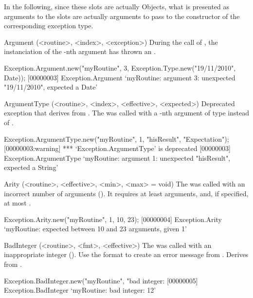In the following, since these slots are actually Objects, what is presented
as arguments to the slots are actually arguments to pass to the constructor
of the corresponding exception type.
\begin{urbiscriptapi}
\item[Argument](<routine>, <index>, <exception>)
  During the call of , the instanciation of the -nth
  argument has thrown an .
\begin{urbiscript}
Exception.Argument.new("myRoutine", 3, Exception.Type.new("19/11/2010", Date));
[00000003] Exception.Argument `myRoutine: argument 3: unexpected "19/11/2010", expected a Date'
\end{urbiscript}

\item[ArgumentType](<routine>, <index>, <effective>, <expected>)
  Deprecated exception that derives from .  The  was
  called with a -nth argument of type 
  instead of .
\begin{urbiscript}
Exception.ArgumentType.new("myRoutine", 1, "hisResult", "Expectation");
[00000003:warning] *** `Exception.ArgumentType' is deprecated
[00000003] Exception.ArgumentType `myRoutine: argument 1: unexpected "hisResult", expected a String'
\end{urbiscript}

\item[Arity](<routine>, <effective>, <min>, <max> = void)
  The  was called with an incorrect number of arguments
  ().  It requires at least  arguments, and,
  if specified, at most .
\begin{urbiscript}
Exception.Arity.new("myRoutine", 1, 10, 23);
[00000004] Exception.Arity `myRoutine: expected between 10 and 23 arguments, given 1'
\end{urbiscript}
\item[BadInteger](<routine>, <fmt>, <effective>)
  The  was called with an inappropriate integer
  ().  Use the format  to create an error
  message from .  Derives from
  .
\begin{urbiscript}
Exception.BadInteger.new("myRoutine", "bad integer: %
[00000005] Exception.BadInteger `myRoutine: bad integer: 12'
\end{urbiscript}


\end{urbiscriptapi}
